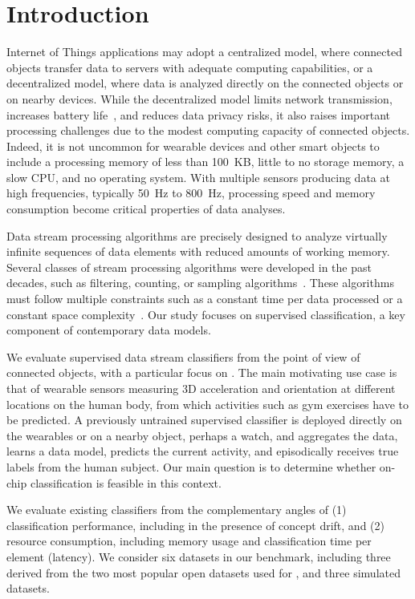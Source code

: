 \section{Introduction}
\label{sec:introduction}

Internet of Things applications may adopt a centralized model, where connected
objects transfer data to servers with adequate computing capabilities, or a
decentralized model, where data is analyzed directly on the connected objects or
on nearby devices. While the decentralized model limits network transmission,
increases battery life~\cite{sensor-network-survey, sensor-energy-model}, and
reduces data privacy risks, it also raises important processing challenges due
to the modest computing capacity of connected objects. Indeed, it is not
uncommon for wearable devices and other smart objects to include a processing
memory of less than 100~KB, little to no storage memory, a slow CPU, and no
operating system. With multiple sensors producing data at high frequencies,
typically 50~Hz to 800~Hz, processing speed and memory consumption become
critical properties of data analyses. 

Data stream processing algorithms are precisely designed to analyze virtually
infinite sequences of data elements with reduced amounts of working memory.
Several classes of stream processing algorithms were developed in the past
decades, such as filtering, counting, or sampling
algorithms~\cite{kejariwal2015}.  These algorithms must follow multiple
constraints such as a constant time per data processed or a constant space
complexity~\cite{issues_learning_from_stream}.  Our study focuses on supervised
classification, a key component of contemporary data models.

We evaluate supervised data stream classifiers from the point of view of
connected objects, with a particular focus on \har. The main motivating use case
is that of wearable sensors measuring 3D acceleration and orientation at
different locations on the human body, from which activities such as gym
exercises have to be predicted. A previously untrained supervised classifier is
deployed directly on the wearables or on a nearby object, perhaps a watch, and
aggregates the data, learns a data model, predicts the current activity, and
episodically receives true labels from the human subject. Our main question is
to determine whether on-chip classification is feasible in this context. 

We evaluate existing classifiers from the complementary angles of (1)
classification performance, including in the presence of concept drift, and
(2) resource consumption, including memory usage and classification time
per element (latency). We consider six datasets in our benchmark, including
three derived from the two most popular open datasets used for \har, and
three simulated datasets.

